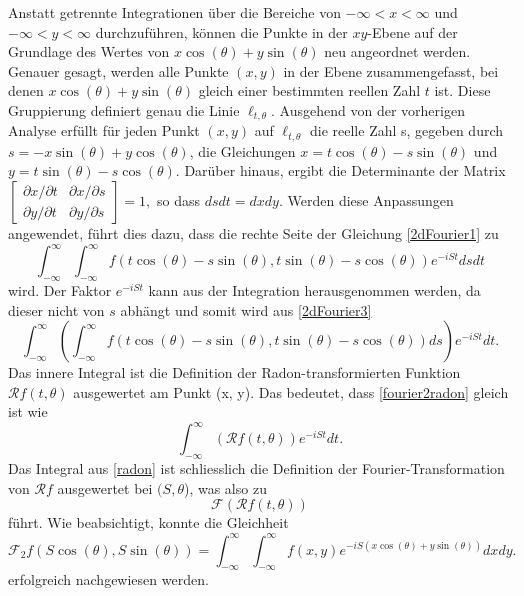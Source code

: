 Anstatt getrennte Integrationen über die Bereiche von $-\infty < x < \infty $ und $-\infty < y < \infty$ durchzuführen, können die Punkte in der $xy$-Ebene auf der Grundlage des Wertes von $x\cos(\theta) + y\sin(\theta)$ neu angeordnet werden. Genauer gesagt, werden alle Punkte $(x, y)$ in der Ebene zusammengefasst, bei denen $x\cos(\theta) + y\sin(\theta)$ gleich einer bestimmten reellen Zahl $t$ ist. Diese Gruppierung definiert genau die Linie $\ell_{t,\theta}$. Ausgehend von der vorherigen Analyse erfüllt für jeden Punkt $(x, y)$ auf $\ell_{t,\theta}$ die reelle Zahl s, gegeben durch $s = -x\sin(\theta) + y\cos(\theta)$, die Gleichungen $x = t\cos(\theta) - s\sin(\theta)$ und $y = t\sin(\theta) - s\cos(\theta)$. Darüber hinaus, ergibt die Determinante der Matrix 
$\begin{bmatrix} \partial x / \partial t & \partial x /\partial s \\
	\partial y /\partial t & \partial y /\partial s \end{bmatrix} = 1,$ so dass $dsdt = dxdy$.
Werden diese Anpassungen angewendet, führt dies dazu, dass die rechte Seite der Gleichung \ref{2dFourier1} zu
\begin{equation}\label{2dFourier3}
	\int_{-\infty}^{\infty}\int_{-\infty}^{\infty} f(t\cos(\theta) - s\sin(\theta), t\sin(\theta) - s\cos(\theta))e^{-iSt}dsdt
\end{equation}
wird. Der Faktor $e^{-iSt}$ kann aus der Integration herausgenommen werden, da dieser nicht von $s$ abhängt und somit wird aus \ref{2dFourier3}
\begin{equation}\label{fourier2radon}
	\int_{-\infty}^{\infty} \left(\int_{-\infty}^{\infty} f(t\cos(\theta) - s\sin(\theta), t\sin(\theta) - s\cos(\theta))ds\right) e^{-iSt}dt.
\end{equation}
Das innere Integral ist die Definition der Radon-transformierten Funktion $\mathscr{R}f(t, \theta)$ ausgewertet am Punkt (x, y). Das bedeutet, dass \ref{fourier2radon} gleich ist wie
\begin{equation}\label{radon}
	\int_{-\infty}^{\infty} (\mathscr{R}f(t, \theta)) e^{-iSt}dt.
\end{equation}
Das Integral aus \ref{radon} ist schliesslich die Definition der Fourier-Transformation von $\mathscr{R}f$ ausgewertet bei $(S, \theta$), was also zu
\begin{equation}\label{fourier1radon}
	\mathscr{F}(\mathscr{R}f(t, \theta))
\end{equation}
führt.
Wie beabsichtigt, konnte die Gleichheit 
\begin{equation}
	\mathscr{F}_2f(S\cos(\theta), S\sin(\theta)) = \int_{-\infty}^{\infty}\int_{-\infty}^{\infty} f(x, y)e^{-iS(x\cos(\theta)+y\sin(\theta))}dxdy.
\end{equation}
erfolgreich nachgewiesen werden.


